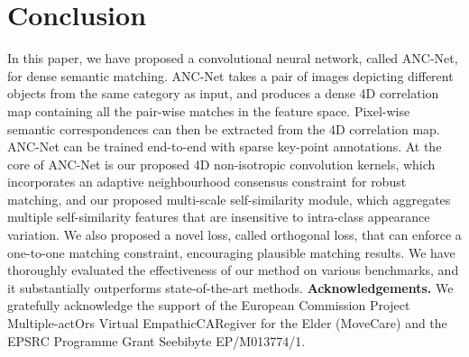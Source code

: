 \documentclass[10pt,twocolumn,letterpaper]{article}
\begin{document}
 \section{Conclusion}


In this paper, we have proposed a convolutional neural network, called ANC-Net, for dense semantic matching.
ANC-Net takes a pair of images depicting different objects from the same category as input, and produces a dense 4D correlation map containing all the pair-wise matches in the feature space.
Pixel-wise semantic correspondences can then be extracted from the 4D correlation map.
ANC-Net can be trained end-to-end with sparse key-point annotations.
At the core of ANC-Net is our proposed 4D non-isotropic convolution kernels, which incorporates an adaptive  neighbourhood consensus constraint for robust matching, and our proposed multi-scale self-similarity module, which aggregates multiple self-similarity features that are insensitive to intra-class appearance variation.
We also proposed a novel loss, called orthogonal loss, that can enforce a one-to-one matching constraint,  encouraging plausible matching results.
We have thoroughly evaluated the effectiveness of our method on various benchmarks, and it substantially outperforms state-of-the-art methods. 
\noindent\textbf{Acknowledgements.} We gratefully acknowledge the support of the European Commission Project Multiple-actOrs Virtual EmpathicCARegiver for the Elder (MoveCare) and the EPSRC Programme Grant Seebibyte  EP/M013774/1.

{\small


}
\end{document}
